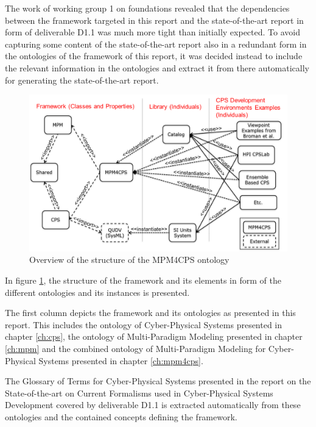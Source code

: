 \documentclass[final]{include/MPM4CPS/MPM4CPS-Report} %
\begin{document}
The work of working group 1 on foundations revealed that the dependencies
between the framework targeted in this report and the state-of-the-art report in
form of deliverable D1.1 \cite{MPM4CPS-D1-1v1} was much more tight than
initially expected. To avoid capturing some content of the state-of-the-art
report also in a redundant form in the ontologies of the framework of this
report, it was decided instead to include the relevant information in the
ontologies and extract it from there automatically for generating the
state-of-the-art report.

\begin{figure}[!htb]
\includegraphics[width=\textwidth]{figures/ontology_structure.png}
\caption{Overview of the structure of the MPM4CPS ontology}
\label{fig:ontology_structure}
\end{figure}

In figure \ref{fig:ontology_structure}, the structure of the framework and its
elements in form of the different ontologies and its instances is  presented.

The first column depicts the framework and its ontologies as presented in this report. This includes 
the ontology of Cyber-Physical Systems presented in chapter \ref{ch:cps}, the
ontology of Multi-Paradigm Modeling presented in chapter \ref{ch:mpm} and the
combined ontology of Multi-Paradigm Modeling for Cyber-Physical Systems
presented in chapter \ref{ch:mpm4cps}.

The Glossary of Terms for Cyber-Physical Systems presented in the report on the
State-of-the-art on Current Formalisms used in Cyber-Physical Systems
Development covered by deliverable D1.1 \cite{MPM4CPS-D1-1v1} is extracted
automatically from these ontologies and the  contained concepts defining the
framework.
\end{document}
